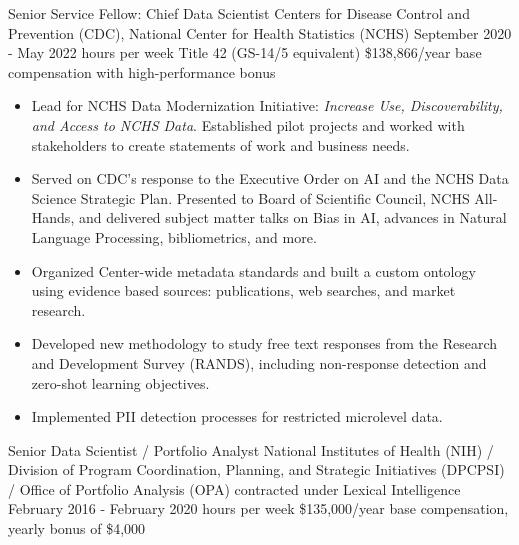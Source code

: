 \documentclass[]{scrartcl}
\begin{document}
\begin{cleanCV}
{\begin{itemize}
  \end{itemize}
}

\vspace{1em}

    
  \WorkExperience
{}
{Senior Service Fellow: Chief Data Scientist}
{
  \newline Centers for Disease Control and Prevention (CDC), National Center for
Health Statistics (NCHS)
  \newline September 2020 - May 2022
   hours per week
  \newline Title 42 (GS-14/5 equivalent) \$138,866/year base compensation with high-performance bonus 
}
{
  \vspace{-0.25em}
  \begin{itemize}

   \item Lead for NCHS Data Modernization Initiative: \emph{Increase Use, Discoverability, and Access to NCHS Data}. Established pilot projects and worked with stakeholders to create statements of work and business needs.
   \item Served on CDC's response to the Executive Order on AI and the NCHS Data Science Strategic Plan. Presented to Board of Scientific Council, NCHS All-Hands, and delivered subject matter talks on Bias in AI, advances in Natural Language Processing, bibliometrics, and more.
   \item Organized Center-wide metadata standards and built a custom ontology using evidence based sources: publications, web searches, and market research.
   \item Developed new methodology to study free text responses from the Research and Development Survey (RANDS), including non-response detection and zero-shot learning objectives.
   \item Implemented PII detection processes for restricted microlevel data.
  \end{itemize}
}
  
  \WorkExperience
{}
{Senior Data Scientist / Portfolio Analyst}
{
  \newline National Institutes of Health (NIH) / Division of Program Coordination, Planning, and Strategic Initiatives (DPCPSI) / Office of Portfolio Analysis (OPA) contracted under Lexical Intelligence
  \newline February 2016 - February 2020
   hours per week
  \newline \$135,000/year base compensation, yearly bonus of \$4,000
}
{
  \vspace{-0.25em}
  \begin{itemize}
    

\end{itemize}}
\end{cleanCV}
\end{document}
